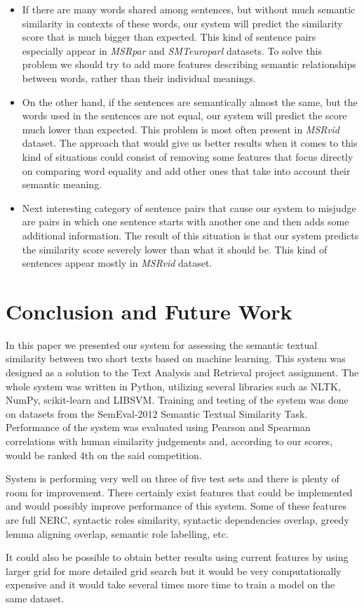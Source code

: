 \documentclass[10pt, a4paper]{article}
\begin{document}
\begin{itemize} \itemsep1pt \parskip0pt 
	\item If there are many words shared among sentences, but without much semantic similarity in contexts of these words, our system will predict the similarity score that is much bigger than expected. This kind of sentence pairs especially appear in \textit{MSRpar} and \textit{SMTeuroparl} datasets. To solve this problem we should try to add more features describing semantic relationships between words, rather than their individual meanings.
	
	\item On the other hand, if the sentences are semantically almost the same, but the words used in the sentences are not equal, our system will predict the score much lower than expected. This problem is most often present in \textit{MSRvid} dataset. The approach that would give us better results when it comes to this kind of situations could consist of removing some features that focus directly on comparing word equality and add other ones that take into account their semantic meaning.
	
	\item Next interesting category of sentence pairs that cause our system to misjudge are pairs in which one sentence starts with another one and then adds some additional information. The result of this situation is that our system predicts the similarity score  severely lower than what it should be. This kind of sentences appear mostly in \textit{MSRvid} dataset.
\end{itemize}

\section{Conclusion and Future Work}

In this paper we presented our system for assessing the semantic textual similarity between two short texts based on machine learning. This system was designed as a solution to the Text Analysis and Retrieval project assignment. The whole system was written in Python, utilizing several libraries such as NLTK, NumPy, scikit-learn and LIBSVM. Training and testing of the system was done on datasets from the SemEval-2012 Semantic Textual Similarity Task. Performance of the system was evaluated using Pearson and Spearman correlations with human similarity judgements and, according to our scores, would be ranked 4th on the said competition.

System is performing very well on three of five test sets and there is plenty of room for improvement. There certainly exist features that could be implemented and would possibly improve performance of this system. Some of these features are full NERC, syntactic roles similarity, syntactic dependencies overlap, greedy lemma aligning overlap, semantic role labelling, etc.

It could also be possible to obtain better results using current features by using larger grid for more detailed grid search but it would be very computationally expensive and it would take several times more time to train a model on the same dataset.

\nocite{*}

 
\end{document}
